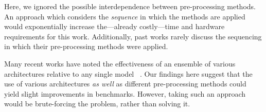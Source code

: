 \documentclass[pmlr,twocolumn]{jmlr}%
\begin{document}
Here, we ignored the possible interdependence between pre-processing methods. An approach which considers the \textit{sequence} in which the methods are applied would exponentially increase the---already costly---time and hardware requirements for this work. Additionally, past works rarely discuss the sequencing in which their pre-processing methods were applied. 

Many recent works have noted the effectiveness of an  ensemble of various architectures relative to any single model ~\citep{uwaechia2021comprehensive,hong2022practical,IsmailFawaz2018deep,strodthoff2020deep,chen2020detection}. Our findings here suggest that the use of various architectures \textit{as well} as different pre-processing methods could yield slight improvements in benchmarks. However, taking such an approach would be brute-forcing the problem, rather than solving it. 









 

 
\end{document}
